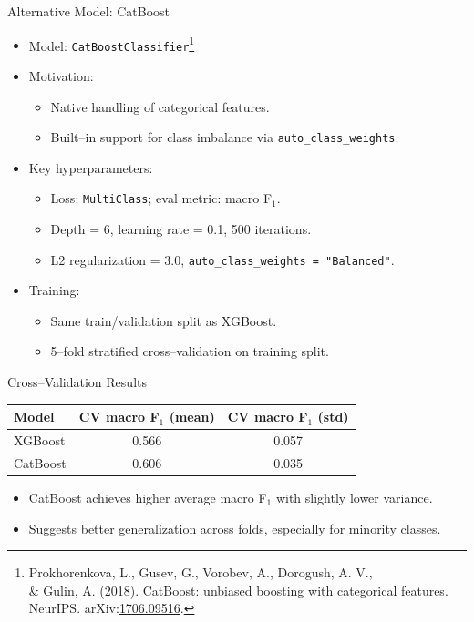 \documentclass[aspectratio=169]{beamer}
\begin{document}
\begin{frame}{Alternative Model: CatBoost}
  \begin{itemize}
    \item Model: \texttt{CatBoostClassifier}\footnote{Prokhorenkova, L., Gusev, G., Vorobev, A., Dorogush, A. V., \\& Gulin, A. (2018). CatBoost: unbiased boosting with categorical features. NeurIPS. arXiv:\href{https://arxiv.org/abs/1706.09516}{1706.09516}.}
    \item Motivation:
    \begin{itemize}
      \item Native handling of categorical features.
      \item Built--in support for class imbalance via \texttt{auto\_class\_weights}.
    \end{itemize}
    \item Key hyperparameters:
    \begin{itemize}
      \item Loss: \texttt{MultiClass}; eval metric: macro F$_1$.
      \item Depth = 6, learning rate = 0.1, 500 iterations.
      \item L2 regularization = 3.0, \texttt{auto\_class\_weights = "Balanced"}.
    \end{itemize}
    \item Training:
    \begin{itemize}
      \item Same train/validation split as XGBoost.
      \item 5--fold stratified cross--validation on training split.
    \end{itemize}
  \end{itemize}
\end{frame}

\begin{frame}{Cross--Validation Results}
  \begin{center}
    \begin{tabular}{lcc}
      \toprule
      Model & CV macro F$_1$ (mean) & CV macro F$_1$ (std) \\
      \midrule
      XGBoost & 0.566 & 0.057 \\
      CatBoost & 0.606 & 0.035 \\
      \bottomrule
    \end{tabular}
  \end{center}
  \vspace{1em}
  \begin{itemize}
    \item CatBoost achieves higher average macro F$_1$ with slightly lower variance.
    \item Suggests better generalization across folds, especially for minority classes.
  \end{itemize}
\end{frame}
\end{document}
